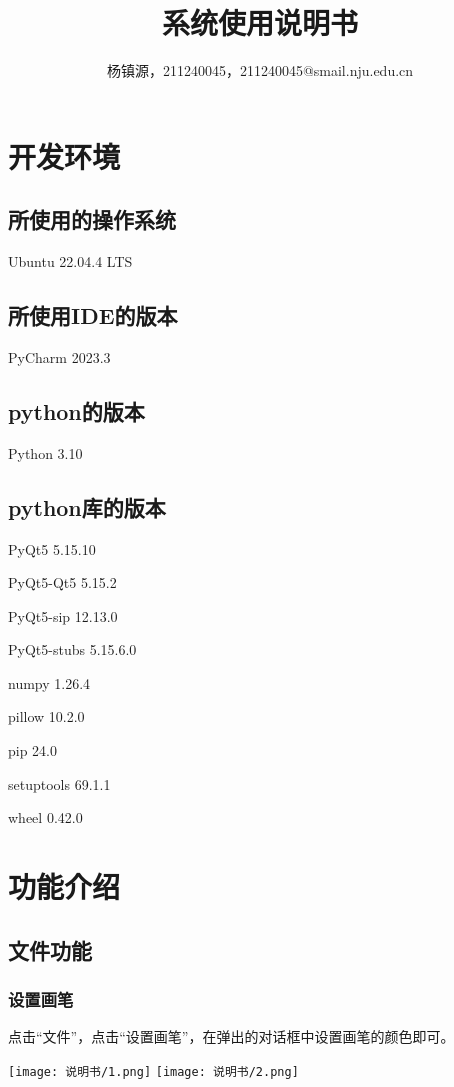 \documentclass{article}
\title{\textbf{系统使用说明书}}
\author{杨镇源，211240045，211240045@smail.nju.edu.cn}
\begin{document}
	\maketitle
	\tableofcontents 
	\newpage
	\section{开发环境}
	\subsection{所使用的操作系统}
	Ubuntu 22.04.4 LTS
	
	\subsection{所使用IDE的版本}
	PyCharm 2023.3
	
	\subsection{python的版本}
	Python 3.10
	
	\subsection{python库的版本}
	PyQt5 5.15.10
	
	PyQt5-Qt5 5.15.2
	
	PyQt5-sip 12.13.0
	
	PyQt5-stubs 5.15.6.0
	
	numpy 1.26.4
	
	pillow 10.2.0
	
	pip 24.0
	
	setuptools 69.1.1
	
	wheel 0.42.0
	
	\section{功能介绍}
		\subsection{文件功能}
		\subsubsection{设置画笔}
		点击“文件”，点击“设置画笔”，在弹出的对话框中设置画笔的颜色即可。
		\begin{center}
			\texttt{[image: 说明书/1.png]}
			\texttt{[image: 说明书/2.png]}
		\end{center}
	
\end{document}
